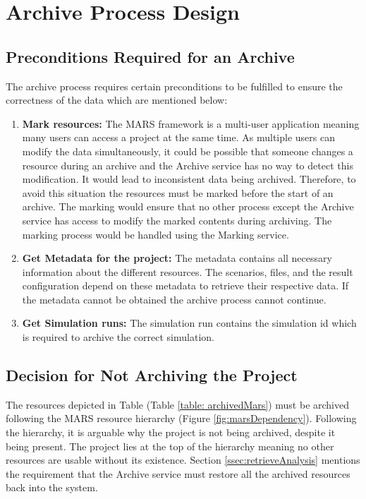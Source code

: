 \section{Archive Process Design}
\subsection{Preconditions Required for an Archive}
The archive process requires certain preconditions to be fulfilled to ensure the correctness of the data which are mentioned below:
\begin{enumerate}
    \label{lst:preconditionsArchive}
    \item \textbf{Mark resources:} The MARS framework is a multi-user application meaning many users can access a project at the same time. 
    As multiple users can modify the data simultaneously, it could be possible that someone changes a resource during an archive and the 
    Archive service has no way to detect this modification. It would lead to inconsistent data being archived.
    Therefore, to avoid this situation the resources must be marked before the start of an archive. The marking would ensure that no other process except the Archive
    service has access to modify the marked contents during archiving. The marking process would be handled using the Marking service.
    \item \textbf{Get Metadata for the project:} The metadata contains all necessary information about
    the different resources. The scenarios, files, and the result configuration depend on these metadata
    to retrieve their respective data. If the metadata cannot be obtained the archive process cannot continue.
    \item \textbf{Get Simulation runs:} The simulation run contains the simulation id which is required to archive the correct simulation.
\end{enumerate}

\subsection{Decision for Not Archiving the Project}
The resources depicted in Table (Table \ref{table: archivedMars}) must be archived following the MARS resource hierarchy (Figure \ref{fig:marsDependency}).
Following the hierarchy, it is arguable why the project is not being archived, despite it being present. The project lies at the top of the hierarchy 
meaning no other resources are usable without its existence. Section \ref{ssec:retrieveAnalysis} mentions the requirement that the Archive service must 
restore all the archived resources back into the system. 

